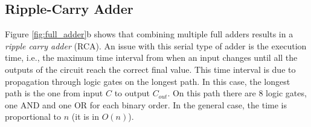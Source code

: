 
\subsection{Ripple-Carry Adder}
Figure \ref{fig:full_adder}b shows that combining multiple full adders results in a \textit{ripple carry adder} (RCA). An issue with this serial type of adder is the execution time, i.e., the maximum time interval from when an input changes until all the outputs of the circuit reach the correct final value. This time interval is due to propagation through logic gates on the longest path. In this case, the longest path is the one from input $C$ to output $C_{out}$. On this path there are 8 logic gates, one AND and one OR for each binary order. In the general case, the time is proportional to $n$ (it is in $O(n)$).

